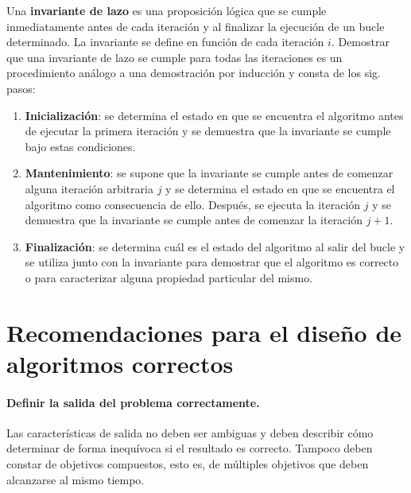 Una \textbf{invariante de lazo} es una proposición lógica que se cumple inmediatamente antes de cada iteración y al finalizar la ejecución de un bucle determinado.
La invariante se define en función de cada iteración \(i\).
Demostrar que una invariante de lazo se cumple para todas las iteraciones es un procedimiento análogo a una demostración por inducción y consta de los sig. pasos: 
\begin{enumerate}
  \item \textbf{Inicialización}: se determina el estado en que se encuentra el algoritmo antes de ejecutar la primera iteración y se demuestra que la invariante se cumple bajo estas condiciones.
  \item \textbf{Mantenimiento}: se supone que la invariante se cumple antes de comenzar alguna iteración arbitraria \(j\) y se determina el estado en que se encuentra el algoritmo como consecuencia de ello. 
  Después, se ejecuta la iteración \(j\) y se demuestra que la invariante se cumple antes de comenzar la iteración \(j+1\).
  \item \textbf{Finalización}: se determina cuál es el estado del algoritmo al salir del bucle y se utiliza junto con la invariante para demostrar que el algoritmo es correcto o para caracterizar alguna propiedad particular del mismo. 
\end{enumerate}


\section{Recomendaciones para el diseño de algoritmos correctos}

\paragraph*{Definir la salida del problema correctamente.}{%
  Las características de salida no deben ser ambiguas y deben describir cómo determinar de forma inequívoca si el resultado es correcto.
  Tampoco deben constar de objetivos compuestos, esto es, de múltiples objetivos que deben alcanzarse al mismo tiempo.
}

